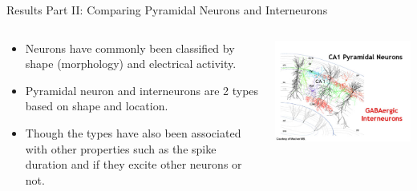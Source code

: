 \documentclass[aspectratio=169]{beamer}
\begin{document}
\begin{frame}{Results Part II: Comparing Pyramidal Neurons and Interneurons}
    \begin{columns}
        \begin{column}{0.48\textwidth}
            \begin{itemize}
                \item Neurons have commonly been classified by shape (morphology) and
                    electrical activity. 
                \item Pyramidal neuron and interneurons are 2 types based on shape and location.
                \item Though the types have also been associated with other properties
                    such as the spike duration and if they excite other neurons or not.
            \end{itemize}
        \end{column}
        \begin{column}{0.48\textwidth}
            \begin{center}
                \includegraphics[width=\textwidth]{images/pyr_int_neuron.jpg}
            \end{center}
        \end{column}
    \end{columns}
\end{frame}
\end{document}
